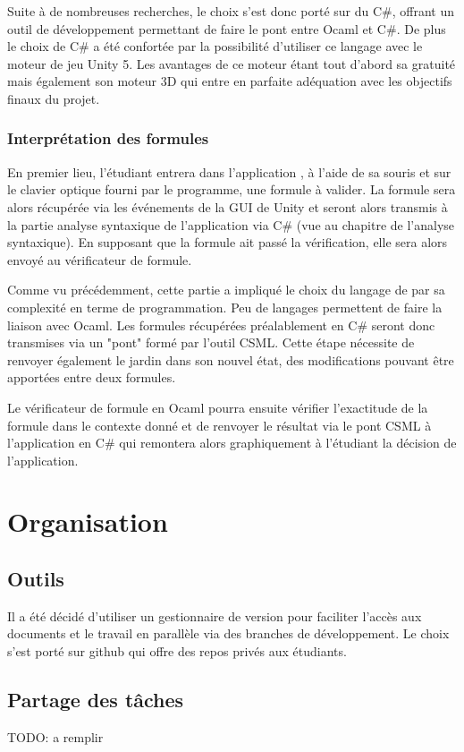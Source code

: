 \documentclass{article}
\theoremstyle{plain}
\theoremstyle{remark}
\begin{document}
Suite à de nombreuses recherches, le choix s'est donc porté sur du C\#, offrant un outil de développement permettant de faire le pont entre Ocaml et C\#.
De plus le choix de C\# a été confortée par la possibilité d'utiliser ce langage avec le moteur de jeu Unity 5. 
Les avantages de ce moteur étant tout d'abord sa gratuité mais également son moteur 3D qui entre en parfaite adéquation avec les objectifs finaux du projet.

\subsubsection{Interprétation des formules}
En premier lieu, l'étudiant entrera dans l'application , à l'aide de sa souris et sur le clavier optique fourni par le programme, une formule à valider.
La formule sera alors récupérée via les événements de la GUI de Unity et seront alors transmis à la partie analyse syntaxique de l'application via C\# (vue au chapitre de l'analyse syntaxique). En supposant que la formule ait passé la vérification, elle sera alors envoyé au vérificateur de formule.

Comme vu précédemment, cette partie a impliqué le choix du langage de par sa complexité en terme de programmation. Peu de langages permettent de faire la liaison avec Ocaml. Les formules récupérées préalablement en C\# seront donc transmises via un "pont" formé par l'outil CSML. Cette étape nécessite de renvoyer également le jardin dans son nouvel état, des modifications pouvant être apportées entre deux formules.

Le vérificateur de formule en Ocaml pourra ensuite vérifier l'exactitude de la formule dans le contexte donné et de renvoyer le résultat via le pont CSML à l'application en C\# qui remontera alors graphiquement à l'étudiant la décision de l'application.


\section{Organisation}
\subsection{Outils}
Il a été décidé d'utiliser un gestionnaire de version pour faciliter l'accès aux documents et le travail en parallèle via des branches de développement.
Le choix s'est porté sur github qui offre des repos privés aux étudiants.

\subsection{Partage des tâches}
TODO: a remplir
\end{document}
